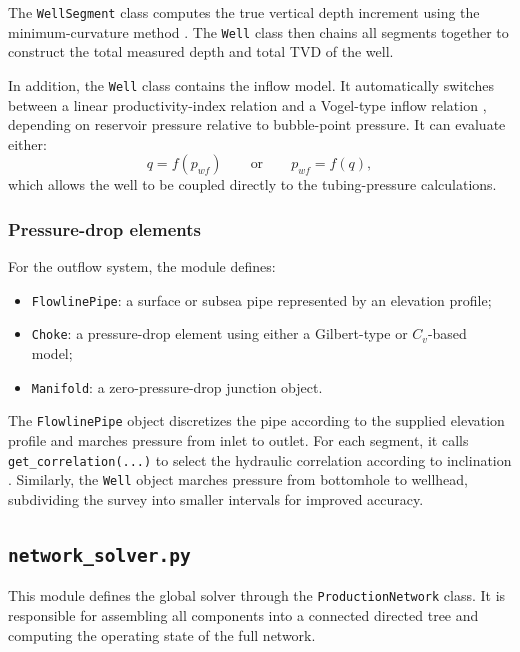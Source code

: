 The \texttt{WellSegment} class computes the true vertical depth increment using
the minimum-curvature method \cite{Wolff1981}. The \texttt{Well} class then
chains all segments together to construct the total measured depth and total TVD
of the well.

In addition, the \texttt{Well} class contains the inflow model. It
automatically switches between a linear productivity-index relation
and a Vogel-type inflow relation \cite{Vogel1968}, depending
on reservoir pressure relative to bubble-point pressure. It can evaluate either:
\[
q = f(p_{wf})
\qquad \text{or} \qquad
p_{wf} = f(q),
\]
which allows the well to be coupled directly to the tubing-pressure
calculations.

\subsubsection*{Pressure-drop elements}

For the outflow system, the module defines:

\begin{itemize}
    \item \texttt{FlowlinePipe}: a surface or subsea pipe represented by an
          elevation profile;
    \item \texttt{Choke}: a pressure-drop element using either a Gilbert-type
          \cite{Gilbert1954} or $C_v$-based model;
    \item \texttt{Manifold}: a zero-pressure-drop junction object.
\end{itemize}

The \texttt{FlowlinePipe} object discretizes the pipe according to the supplied
elevation profile and marches pressure from inlet to outlet. For each segment,
it calls \texttt{get\_correlation(...)} to select the hydraulic correlation
according to inclination \cite{BeggsBrill1973,HagedornBrown1965}. Similarly,
the \texttt{Well} object marches pressure from bottomhole to wellhead,
subdividing the survey into smaller intervals for improved accuracy.

\subsection*{\texttt{network\_solver.py}}

This module defines the global solver through the \texttt{ProductionNetwork}
class. It is responsible for assembling all components into a connected directed
tree and computing the operating state of the full network.

